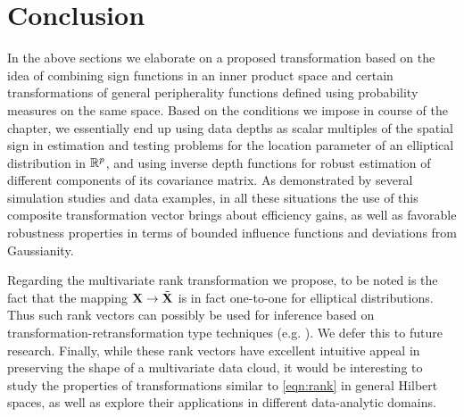 %

\section{Conclusion}\label{section:sec7}
\label{section:Conclusion}
In the above sections we elaborate on a proposed transformation based on the idea of combining sign functions in an inner product space and certain transformations of general peripherality functions defined using probability measures on the same space. Based on the conditions we impose in course of the chapter, we essentially end up using data depths as scalar multiples of the spatial sign in estimation and testing problems for the location parameter of an elliptical distribution in ${\mathbb{R}}^p$, and using inverse depth functions for robust estimation of different components of its covariance matrix. As demonstrated by several simulation studies and data examples, in all these situations the use of this composite transformation vector brings about efficiency gains, as well as favorable robustness properties in terms of bounded influence functions and deviations from Gaussianity.

Regarding the multivariate rank transformation we propose, to be noted is the fact that the mapping ${\mathbf{X}} \rightarrow \tilde {{\mathbf{X}}}$ is in fact one-to-one for elliptical distributions. Thus such rank vectors can possibly be used for inference based on transformation-retransformation type techniques (e.g. \cite{ChakrabortyChaudhuri96,ChakrabortyChaudhuriOja98}). We defer this to future research. Finally, while these rank vectors have excellent intuitive appeal in preserving the shape of a multivariate data cloud, it would be interesting to study the properties of transformations similar to \eqref{eqn:rank} in general Hilbert spaces, as well as explore their applications in different data-analytic domains.